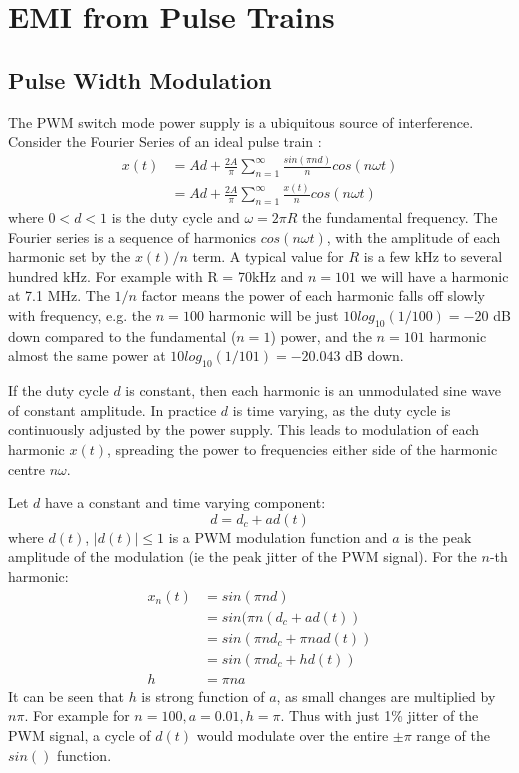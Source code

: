 \documentclass{article}
\begin{document}
\section{EMI from Pulse Trains}
\label{pwm}

\subsection{Pulse Width Modulation}
\label{smps}

The PWM switch mode power supply is a ubiquitous source of interference.  Consider the Fourier Series of an ideal pulse train \cite{wikipedia_pulse}:
\begin{equation} \label{eq_pwm}
\begin{split}
x(t) &= Ad+\frac{2A}{\pi} \sum_{n=1}^{\infty} \frac{sin(\pi n d)}{n}cos(n \omega t) \\
     &= Ad+\frac{2A}{\pi} \sum_{n=1}^{\infty} \frac{x(t)}{n} cos(n \omega t)
\end{split}
\end{equation}
where $0<d<1$ is the duty cycle and $\omega=2 \pi R$ the fundamental frequency.  The Fourier series is a sequence of harmonics $cos(n \omega t)$, with the amplitude of each harmonic set by the $x(t)/n$ term. A typical value for $R$ is a few kHz to several hundred kHz. For example with R = 70kHz and $n=101$ we will have a harmonic at 7.1 MHz. The $1/n$ factor means the power of each harmonic falls off slowly with frequency, e.g. the $n=100$ harmonic will be just $10log_{10}(1/100)=-20$ dB down compared to the fundamental ($n=1$) power, and the $n=101$ harmonic almost the same power at $10log_{10}(1/101)=-20.043$ dB down.

If the duty cycle $d$ is constant, then each harmonic is an unmodulated sine wave of constant amplitude. In practice $d$ is time varying, as the duty cycle is continuously adjusted by the power supply.  This leads to modulation of each harmonic $x(t)$, spreading the power to frequencies either side of the harmonic centre $n \omega$.

Let $d$ have a constant and time varying component:
\begin{equation}
d=d_c+ad(t)
\end{equation}
where $d(t)$, $|d(t)| \le 1$ is a PWM modulation function and $a$ is the peak amplitude of the modulation (ie the peak jitter of the PWM signal). For the $n$-th harmonic:
\begin{equation} \label{eq:pwm_n}
\begin{split}
x_n(t) &= sin(\pi n d) \\
       &= sin(\pi n (d_c+ad(t)) \\
       &= sin(\pi n d_c + \pi n a d(t)) \\
       &= sin(\pi n d_c + h d(t))  \\
     h &= \pi n a
\end{split}
\end{equation}
It can be seen that $h$ is strong function of $a$, as small changes are multiplied by $n \pi$. For example for $n=100, a=0.01, h = \pi$.  Thus with just 1\% jitter of the PWM signal, a cycle of $d(t)$ would modulate over the entire $\pm \pi$ range of the $sin()$ function.
\end{document}
